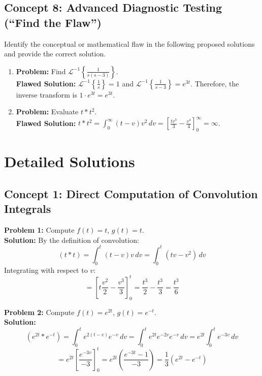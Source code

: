 \documentclass[11pt, letterpaper]{article}
\theoremstyle{definition}
\theoremstyle{remark}
\begin{document}
\subsection{Concept 8: Advanced Diagnostic Testing (``Find the Flaw'')}
Identify the conceptual or mathematical flaw in the following proposed solutions and provide the correct solution.
\begin{enumerate}[label=\textbf{\arabic*.}, resume]
    \item \textbf{Problem:} Find $\mathcal{L}^{-1}\left\{\frac{1}{s(s-3)}\right\}$.\\
    \textbf{Flawed Solution:} $\mathcal{L}^{-1}\left\{\frac{1}{s}\right\} = 1$ and $\mathcal{L}^{-1}\left\{\frac{1}{s-3}\right\} = e^{3t}$. Therefore, the inverse transform is $1 \cdot e^{3t} = e^{3t}$.
    \item \textbf{Problem:} Evaluate $t * t^2$.\\
    \textbf{Flawed Solution:} $t * t^2 = \int_0^\infty (t-v)v^2 \, dv = \left[ \frac{tv^3}{3} - \frac{v^4}{4} \right]_0^\infty = \infty$.
\end{enumerate}

\newpage

\section{Detailed Solutions}

\subsection{Concept 1: Direct Computation of Convolution Integrals}

\textbf{Problem 1:} Compute $f(t) = t$, $g(t) = t$.
\vspace{0.5em}\\
\textbf{Solution:}
By the definition of convolution:
\[ (t * t) = \int_0^t (t-v)v \, dv = \int_0^t (tv - v^2) \, dv \]
Integrating with respect to $v$:
\[ = \left[ t\frac{v^2}{2} - \frac{v^3}{3} \right]_0^t = \frac{t^3}{2} - \frac{t^3}{3} = \frac{t^3}{6} \]

\textbf{Problem 2:} Compute $f(t) = e^{2t}$, $g(t) = e^{-t}$.
\vspace{0.5em}\\
\textbf{Solution:}
\[ (e^{2t} * e^{-t}) = \int_0^t e^{2(t-v)}e^{-v} \, dv = \int_0^t e^{2t}e^{-2v}e^{-v} \, dv = e^{2t} \int_0^t e^{-3v} \, dv \]
\[ = e^{2t} \left[ \frac{e^{-3v}}{-3} \right]_0^t = e^{2t} \left( \frac{e^{-3t} - 1}{-3} \right) = \frac{1}{3}(e^{2t} - e^{-t}) \]
\end{document}
